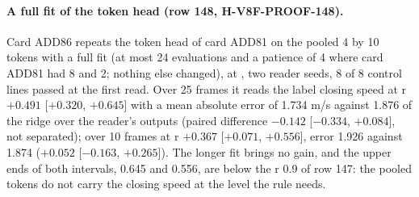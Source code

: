 \paragraph{A full fit of the token head (row 148, H-V8F-PROOF-148).} Card ADD86 repeats the token head of card ADD81 on the pooled 4 by 10 tokens with a full fit (at most 24 evaluations and a patience of 4 where card ADD81 had 8 and 2; nothing else changed), at , two reader seeds, 8 of 8 control lines passed at the first read. Over 25 frames it reads the label closing speed at r $+0.491$ [$+0.320$, $+0.645$] with a mean absolute error of 1.734 m/s against 1.876 of the ridge over the reader's outputs (paired difference $-0.142$ [$-0.334$, $+0.084$], not separated); over 10 frames at r $+0.367$ [$+0.071$, $+0.556$], error 1.926 against 1.874 ($+0.052$ [$-0.163$, $+0.265$]). The longer fit brings no gain, and the upper ends of both intervals, 0.645 and 0.556, are below the r 0.9 of row 147: the pooled tokens do not carry the closing speed at the level the rule needs.
